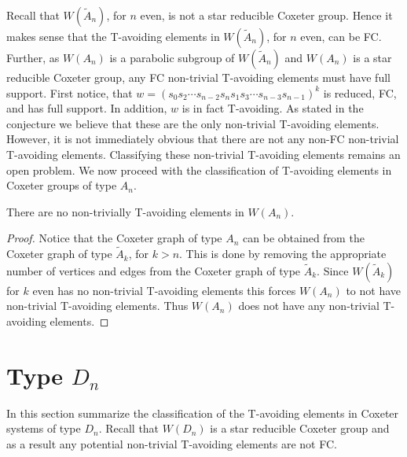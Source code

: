 Recall that $W(\widetilde{A}_n)$, for $n$ even, is not a star reducible Coxeter group. Hence it makes sense that the T-avoiding elements in $W(\widetilde{A}_n)$, for $n$ even, can be FC. Further, as $W(A_n)$ is a parabolic subgroup of $W(\widetilde{A}_n)$ and $W(A_n)$ is a star reducible Coxeter group, any FC non-trivial T-avoiding elements must have full support. First notice, that $w=(s_0s_2 \cdots s_{n-2}s_ns_1s_3 \cdots s_{n-3}s_{n-1})^k$ is reduced, FC, and has full support. In addition, $w$ is in fact T-avoiding. As stated in the conjecture we believe that these are the only non-trivial T-avoiding elements. However, it is not immediately obvious that there are not any non-FC non-trivial T-avoiding elements. Classifying these non-trivial T-avoiding elements remains an open problem. We now proceed with the classification of T-avoiding elements in Coxeter groups of type $A_n$. 

\begin{corollary}
There are no non-trivially T-avoiding elements in $W(A_n)$. 
\begin{proof}
Notice that the Coxeter graph of type $A_n$ can be obtained from the Coxeter graph of type $\widetilde{A}_k$, for $k > n$. This is done by removing the appropriate number of vertices and edges from the Coxeter graph of type $\widetilde{A}_k$. Since $W(\widetilde{A}_k)$ for $k$ even has no non-trivial T-avoiding elements this forces $W(A_n)$ to not have non-trivial T-avoiding elements. Thus $W(A_n)$ does not have any non-trivial T-avoiding elements.  
\end{proof}
\end{corollary}



\section{Type $D_n$}

In this section summarize the classification of the T-avoiding elements in Coxeter systems of type $D_n$. Recall that $W(D_n)$ is a star reducible Coxeter group and as a result any potential non-trivial T-avoiding elements are not FC.

